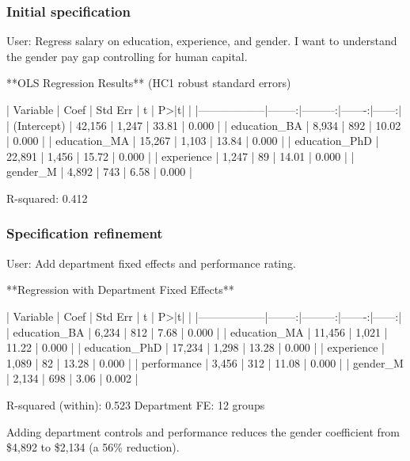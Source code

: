 \subsubsection{Initial specification}

\begin{Sinput}
User: Regress salary on education, experience, and gender. I want to
      understand the gender pay gap controlling for human capital.
\end{Sinput}

\begin{Soutput}
**OLS Regression Results** (HC1 robust standard errors)

| Variable         |     Coef |   Std Err |      t | P>|t| |
|------------------|--------:|---------:|-------:|------:|
| (Intercept)      | 42,156  |   1,247  | 33.81  | 0.000 |
| education_BA     |  8,934  |     892  | 10.02  | 0.000 |
| education_MA     | 15,267  |   1,103  | 13.84  | 0.000 |
| education_PhD    | 22,891  |   1,456  | 15.72  | 0.000 |
| experience       |  1,247  |      89  | 14.01  | 0.000 |
| gender_M         |  4,892  |     743  |  6.58  | 0.000 |

R-squared: 0.412
\end{Soutput}

\subsubsection{Specification refinement}

\begin{Sinput}
User: Add department fixed effects and performance rating.
\end{Sinput}

\begin{Soutput}
**Regression with Department Fixed Effects**

| Variable         |     Coef |   Std Err |      t | P>|t| |
|------------------|--------:|---------:|-------:|------:|
| education_BA     |  6,234  |     812  |  7.68  | 0.000 |
| education_MA     | 11,456  |   1,021  | 11.22  | 0.000 |
| education_PhD    | 17,234  |   1,298  | 13.28  | 0.000 |
| experience       |  1,089  |      82  | 13.28  | 0.000 |
| performance      |  3,456  |     312  | 11.08  | 0.000 |
| gender_M         |  2,134  |     698  |  3.06  | 0.002 |

R-squared (within): 0.523
Department FE: 12 groups

Adding department controls and performance reduces the gender coefficient
from \$4,892 to \$2,134 (a 56\% reduction).
\end{Soutput}


